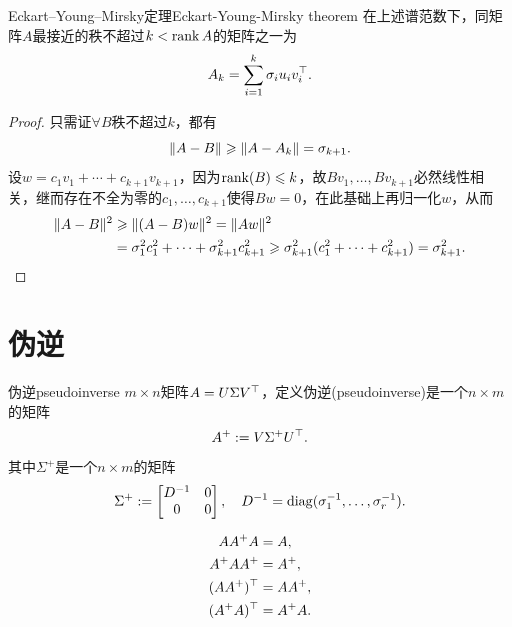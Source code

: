 \begin{theorem}{Eckart--Young--Mirsky定理}{Eckart-Young-Mirsky theorem}
	在上述谱范数下，同矩阵$A$最接近的秩不超过$k < \operatorname{rank} A$的矩阵之一为
	\begin{equation}
		A_k = \sum_{i=1}^k\sigma_iu_iv_i^\top.
	\end{equation}
\end{theorem}
\begin{proof}
	只需证$\forall B$秩不超过$k$，都有
	\begin{equation}\label{eq:la-optimal-low-rank-error}
		\lVert A - B\rVert \geqslant \lVert A - A_k\rVert = \sigma_{k+1}.
	\end{equation}
	设$w = c_1v_1 + \cdots + c_{k+1}v_{k+1}$，因为$\operatorname{rank}(B) \leqslant k$，故$Bv_1,\ldots,Bv_{k+1}$必然线性相关，继而存在不全为零的$c_1,\ldots,c_{k+1}$使得$Bw = 0$，在此基础上再归一化$w$，从而
	\begin{align*}
		\lVert A - B\rVert^2 &\geqslant \lVert(A - B)w\rVert^2 = \lVert Aw\rVert^2\\
		&= \sigma_1^2c_1^2 + \cdots + \sigma_{k+1}^2c_{k+1}^2 \geqslant \sigma_{k+1}^2(c_1^2 + \cdots + c_{k+1}^2) = \sigma_{k+1}^2.
		\qedhere
	\end{align*}
\end{proof}

\section{伪逆}

\begin{definition}{伪逆}{pseudoinverse}
	$m \times n$矩阵$A = U\Sigma V^\top$，定义伪逆(pseudoinverse)是一个$n \times m$的矩阵
	\begin{equation}
		A^+ := V\Sigma^+U^\top.
	\end{equation}
	其中$\Sigma^+$是一个$n \times m$的矩阵
	\begin{equation}\label{eq:la-reciprocal-singular-values}
		\Sigma^+ := \begin{bmatrix}
			D^{-1}&0\\0&0
		\end{bmatrix},\quad D^{-1} = \operatorname{diag}(\sigma_1^{-1},\ldots,\sigma_r^{-1}).
	\end{equation}
\end{definition}

\begin{corollary}
	\begin{subequations}
		\begin{align}
			AA^+A &= A,\\
			A^+AA^+ &= A^+,\\
			(AA^+)^\top &= AA^+,\\
			(A^+A)^\top &= A^+A.
		\end{align}
	\end{subequations}
\end{corollary}

